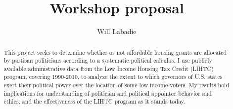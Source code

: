 \documentclass[a4paper,10pt]{article}
\title{Workshop proposal}
\author{Will Labadie}
\begin{document}
\maketitle


\begin{abstract} 
This project seeks to determine whether or not affordable housing grants are allocated by partisan politicians according to a systematic political calculus. I use publicly available administrative data from the Low Income Housing Tax Credit (LIHTC) program, covering 1990-2010, to analyze the extent to which governors of U.S. states exert their political power over the location of some low-income voters. My results hold implications for understanding of politician and political appointee behavior and ethics, and the effectiveness of the LIHTC program as it stands today. 
\end{abstract}
\end{document}
